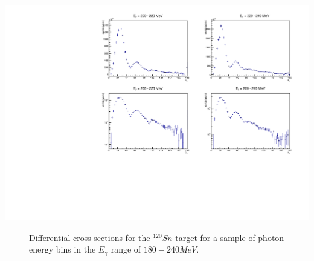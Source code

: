 \includegraphics[scale=0.55]{pictures/pdf/sn120_cross_section_2.pdf}
\begin{figure}[H]
\begin{center}

\caption{Differential cross sections for the $^{120}Sn$ target for a sample of photon energy bins in the $E_{\gamma}$ range of $180 - 240 MeV$.}
\label{cross_section2}
\end{center}
\end{figure}

